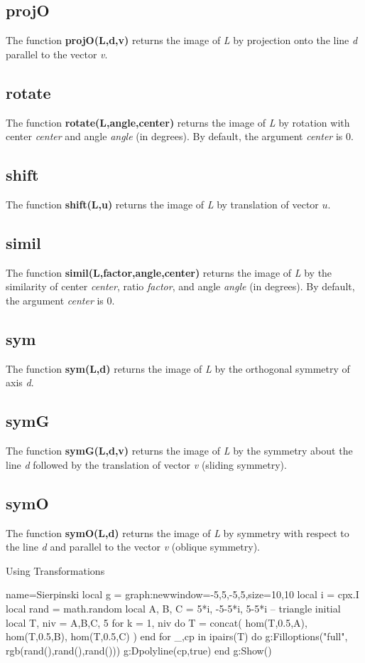 \subsection{projO}
The function \textbf{projO(L,d,v)} returns the image of \emph{L} by projection onto the line \emph{d} parallel to the vector \emph{v}.

\subsection{rotate}
The function \textbf{rotate(L,angle,center)} returns the image of \emph{L} by rotation with center \emph{center} and angle \emph{angle} (in degrees). By default, the argument \emph{center} is 0.

\subsection{shift}
The function \textbf{shift(L,u)} returns the image of \emph{L} by translation of vector \(u\).

\subsection{simil}
The function \textbf{simil(L,factor,angle,center)} returns the image of \emph{L} by the similarity of center \emph{center}, ratio \emph{factor}, and angle \emph{angle} (in degrees). By default, the argument \emph{center} is 0.

\subsection{sym}
The function \textbf{sym(L,d)} returns the image of \emph{L} by the orthogonal symmetry of axis \emph{d}.

\subsection{symG}
The function \textbf{symG(L,d,v)} returns the image of \emph{L} by the symmetry about the line \emph{d} followed by the translation of vector \emph{v} (sliding symmetry).

\subsection{symO}
The function \textbf{symO(L,d)} returns the image of \emph{L} by symmetry with respect to the line \emph{d} and parallel to the vector \emph{v} (oblique symmetry).

\begin{demo}{Using Transformations}
\begin{luadraw}{name=Sierpinski}
local g = graph:new{window={-5,5,-5,5},size={10,10}}
local i = cpx.I
local rand = math.random
local A, B, C = 5*i, -5-5*i, 5-5*i -- triangle initial
local T, niv = {{A,B,C}}, 5
for k = 1, niv do
    T = concat( hom(T,0.5,A), hom(T,0.5,B), hom(T,0.5,C) )
end
for _,cp in ipairs(T) do
    g:Filloptions("full", rgb(rand(),rand(),rand()))
    g:Dpolyline(cp,true)
end
g:Show()
\end{luadraw}
\end{demo}
